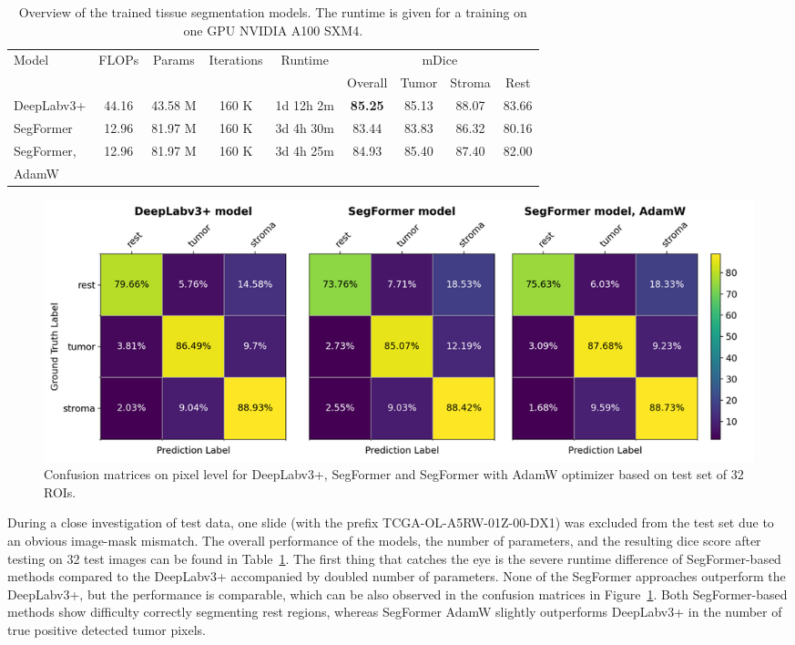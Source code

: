 \begin{table}[h!]
    \centering
    \begin{tabular}{ l c c c c c c c c}
        \hline
        \multirow{2}{*}{Model} & \multirow{2}{*}{FLOPs} & \multirow{2}{*}{Params} & \multirow{2}{*}{Iterations} & \multirow{2}{*}{Runtime} & \multicolumn{4}{c}{mDice}\\
        & & & & & Overall & Tumor & Stroma & Rest \\
        \hline
        DeepLabv3+ & 44.16 & 43.58 M & 160 K & 1d 12h 2m & \textbf{85.25} & 85.13 & 88.07 & 83.66\\
        SegFormer & 12.96 & 81.97 M & 160 K  & 3d 4h 30m & 83.44 & 83.83 & 86.32 & 80.16\\
        SegFormer, & \multirow{2}{*}{12.96} & \multirow{2}{*}{81.97 M} & \multirow{2}{*}{160 K} & \multirow{2}{*}{3d 4h 25m} & \multirow{2}{*}{84.93} & \multirow{2}{*}{85.40} & \multirow{2}{*}{87.40} & \multirow{2}{*}{82.00}\\
        AdamW & & & & & & & & \\
        \hline
    \end{tabular}
\caption{\label{tab:tissue_perform} Overview of the trained tissue segmentation models. The runtime is given for a training on one GPU NVIDIA A100 SXM4.}
\end{table}

\begin{figure}[H]
    \includegraphics[width=\linewidth]{figures/tissue/conf_matrices.png}
    \caption{Confusion matrices on pixel level for DeepLabv3+, SegFormer and SegFormer with AdamW optimizer
    based on test set of 32 ROIs.}
    \label{fig:tissue_confusion}
\end{figure}

During a close investigation of test data, one slide (with the prefix TCGA-OL-A5RW-01Z-00-DX1)
was excluded from the test set due to an obvious image-mask mismatch. The overall
performance of the models, the number of parameters, and the resulting dice score after testing on 
32 test images can be found in Table~\ref*{tab:tissue_perform}. The first thing that catches the eye is the severe runtime difference of
SegFormer-based methods compared to the DeepLabv3+ accompanied by doubled number of parameters.
None of the SegFormer approaches outperform the DeepLabv3+, but the performance
is comparable, which can be also observed in the confusion matrices in Figure~\ref*{fig:tissue_confusion}.
Both SegFormer-based methods show difficulty correctly segmenting rest regions, whereas
SegFormer AdamW slightly outperforms DeepLabv3+ in the number of true positive detected tumor pixels.

